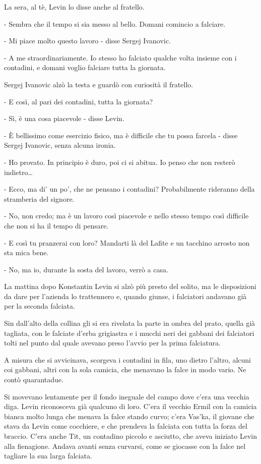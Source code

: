 La sera, al tè, Levin lo disse anche al fratello. 

- Sembra che il tempo si sia messo al bello. Domani comincio a falciare. 

- Mi piace molto questo lavoro - disse Sergej Ivanovic. 

- A me straordinariamente. Io stesso ho falciato qualche volta insieme con i contadini, e domani voglio falciare tutta la giornata. 

Sergej Ivanovic alzò la testa e guardò con curiosità il fratello. 

- E così, al pari dei contadini, tutta la giornata? 

- Sì, è una cosa piacevole - disse Levin. 

- È bellissimo come esercizio fisico, ma è difficile che tu possa farcela - disse Sergej Ivanovic, senza alcuna ironia. 

- Ho provato. In principio è duro, poi ci si abitua. Io penso che non resterò indietro\ldots{} 

- Ecco, ma di' un po', che ne pensano i contadini? Probabilmente rideranno della stramberia del signore. 

- No, non credo; ma è un lavoro così piacevole e nello stesso tempo così difficile che non si ha il tempo di pensare. 

- E così tu pranzerai con loro? Mandarti là del Lafite e un tacchino arrosto non sta mica bene. 

- No, ma io, durante la sosta del lavoro, verrò a casa. 

La mattina dopo Konstantin Levin si alzò più presto del solito, ma le disposizioni da dare per l'azienda lo trattennero e, quando giunse, i falciatori andavano già per la seconda falciata. 

Sin dall'alto della collina gli si era rivelata la parte in ombra del prato, quella già tagliata, con le falciate d'erba grigiastra e i mucchi neri dei gabbani dei falciatori tolti nel punto dal quale avevano preso l'avvio per la prima falciatura. 

A misura che si avvicinava, scorgeva i contadini in fila, uno dietro l'altro, alcuni coi gabbani, altri con la sola camicia, che menavano la falce in modo vario. Ne contò quarantadue. 

Si movevano lentamente per il fondo ineguale del campo dove c'era una vecchia diga. Levin riconosceva già qualcuno di loro. C'era il vecchio Ermil con la camicia bianca molto lunga che menava la falce stando curvo; c'era Vas'ka, il giovane che stava da Levin come cocchiere, e che prendeva la falciata con tutta la forza del braccio. C'era anche Tit, un contadino piccolo e asciutto, che aveva iniziato Levin alla fienagione. Andava avanti senza curvarsi, come se giocasse con la falce nel tagliare la sua larga falciata. 


